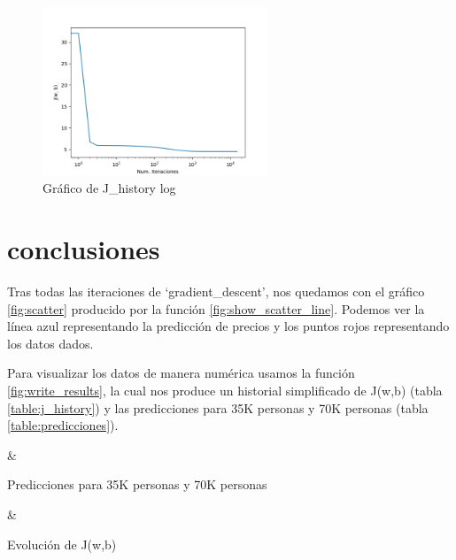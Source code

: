 \documentclass[6pt]{AiTex}
\begin{document}
\begin{figure}[H]
    \centering
    \includegraphics[width=0.6\textwidth]{imagenes/J_history_log.png}
    \caption{Gráfico de J\_history log}
    \label{fig:history_log}
\end{figure}

\section{conclusiones}

Tras todas las iteraciones de `gradient\_descent', nos quedamos con el gráfico \ref{fig:scatter} producido por la función \ref{fig:show_scatter_line}. Podemos ver la línea azul representando la predicción de precios y los puntos rojos representando los datos dados.

Para visualizar los datos de manera numérica usamos la función \ref{fig:write_results}, la cual nos produce un historial simplificado de J(w,b) (tabla \ref{table:j_history}) y las predicciones para 35K personas y 70K personas (tabla \ref{table:predicciones}).

\begin{table}[H]
    \centering
    {\casos & \iterativo}
    \caption{Predicciones para 35K personas y 70K personas}
    \label{table:predicciones}
\end{table}

\begin{table}[H]
    \centering
    {\casos & \iterativo}
    \caption{Evolución de J(w,b)}
    \label{table:j_history}
\end{table}
\end{document}
